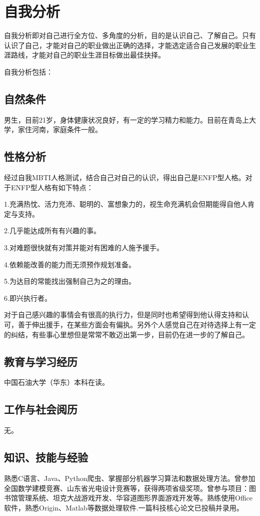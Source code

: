\documentclass{article}
\begin{document}
\thispagestyle{empty}
\newpage
\setcounter{page}{1}
\section{自我分析}
	自我分析即对自己进行全方位、多角度的分析，目的是认识自己、了解自己。只有认识了自己，才能对自己的职业做出正确的选择，才能选定适合自己发展的职业生涯路线，才能对自己的职业生涯目标做出最佳抉择。\par
	自我分析包括：\par
\subsection{自然条件}
男生，目前21岁，身体健康状况良好，有一定的学习精力和能力。目前在青岛上大学，家住河南，家庭条件一般。\par
\subsection{性格分析}
经过自我MBTI人格测试，结合自己对自己的认识，得出自己是ENFP型人格。对于ENFP型人格有如下特点：

1.充满热忱、活力充沛、聪明的、富想象力的，视生命充满机会但期能得自他人肯定与支持。

2.几乎能达成所有有兴趣的事。

3.对难题很快就有对策并能对有困难的人施予援手。

4.依赖能改善的能力而无须预作规划准备。

5.为达目的常能找出强制自己为之的理由。

6.即兴执行者。

对于自己感兴趣的事情会有很高的执行力，但是同时也希望得到他认得支持和认可，善于伸出援手，在某些方面会有偏执。另外个人感觉自己在对待选择上有一定的纠结，有些事心里想但是常常不敢迈出第一步，目前仍在进一步的了解自己。\par
\subsection{教育与学习经历}
中国石油大学（华东）本科在读。\par
\subsection{工作与社会阅历}
无。\par
\subsection{知识、技能与经验}
熟悉C语言、Java、Python爬虫、掌握部分机器学习算法和数据处理方法。曾参加全国数学建模竞赛、山东省光电设计竞赛等，获得两项省级奖项。曾参与项目：图书馆管理系统、坦克大战游戏开发、华容道图形界面游戏开发等。熟练使用Office软件，熟悉Origin、Matlab等数据处理软件.一篇科技核心论文已投稿并录用。\par
\end{document}
